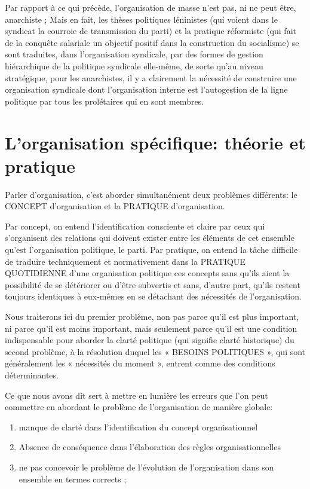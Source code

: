 Par rapport à ce qui précède, l'organisation de masse n'est pas, ni ne peut être, anarchiste ; Mais en fait, les thèses politiques léninistes (qui voient dans le syndicat la courroie de transmission du parti) et la pratique réformiste (qui fait de la conquête salariale un objectif positif dans la construction du socialisme) se sont traduites, dans l'organisation syndicale, par des formes de gestion hiérarchique de la politique syndicale elle-même, de sorte qu'au niveau stratégique, pour les anarchistes, il y a clairement la nécessité de construire une organisation syndicale dont l'organisation interne est l'autogestion de la ligne politique par tous les prolétaires qui en sont membres.

\chapter{L'organisation spécifique: théorie et pratique}

Parler d'organisation, c'est aborder simultanément deux problèmes différents: le CONCEPT d'organisation et la PRATIQUE d'organisation.

Par concept, on entend l'identification consciente et claire par ceux qui s'organisent des relations qui doivent exister entre les éléments de cet ensemble qu'est l'organisation politique, le parti. Par pratique, on entend la tâche difficile de traduire techniquement et normativement dans la PRATIQUE QUOTIDIENNE d'une organisation politique ces concepts sans qu'ils aient la possibilité de se détériorer ou d'être subvertis et sans, d'autre part, qu'ils restent toujours identiques à eux-mêmes en se détachant des nécessités de l'organisation.

Nous traiterons ici du premier problème, non pas parce qu'il est plus important, ni parce qu'il est moins important, mais seulement parce qu'il est une condition indispensable pour aborder la clarté politique (qui signifie clarté historique) du second problème, à la résolution duquel les « BESOINS POLITIQUES », qui sont généralement les « nécessités du moment », entrent comme des conditions déterminantes.

Ce que nous avons dit sert à mettre en lumière les erreurs que l'on peut commettre en abordant le problème de l'organisation de manière globale:

\begin{enumerate}
\item{} manque de clarté dans l'identification du concept organisationnel
\item{} Absence de conséquence dans l'élaboration des règles organisationnelles
\item{} ne pas concevoir le problème de l'évolution de l'organisation dans son ensemble en termes corrects ;
\end{enumerate}

